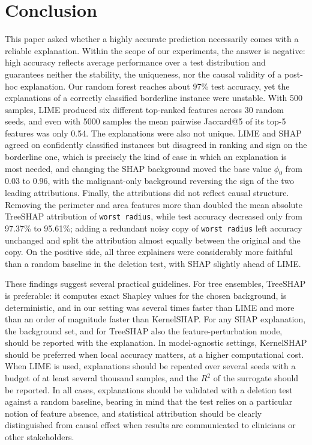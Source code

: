 \section{Conclusion}
\label{sec:conclusion}

This paper asked whether a highly accurate prediction necessarily comes with a reliable explanation. Within the scope of our experiments, the answer is negative: high accuracy reflects average performance over a test distribution and guarantees neither the stability, the uniqueness, nor the causal validity of a post-hoc explanation. Our random forest reaches about 97\% test accuracy, yet the explanations of a correctly classified borderline instance were unstable. With 500 samples, LIME produced six different top-ranked features across 30 random seeds, and even with 5000 samples the mean pairwise Jaccard@5 of its top-5 features was only 0.54. The explanations were also not unique. LIME and SHAP agreed on confidently classified instances but disagreed in ranking and sign on the borderline one, which is precisely the kind of case in which an explanation is most needed, and changing the SHAP background moved the base value $\phi_0$ from 0.03 to 0.96, with the malignant-only background reversing the sign of the two leading attributions. Finally, the attributions did not reflect causal structure. Removing the perimeter and area features more than doubled the mean absolute TreeSHAP attribution of \texttt{worst radius}, while test accuracy decreased only from 97.37\% to 95.61\%; adding a redundant noisy copy of \texttt{worst radius} left accuracy unchanged and split the attribution almost equally between the original and the copy. On the positive side, all three explainers were considerably more faithful than a random baseline in the deletion test, with SHAP slightly ahead of LIME.

These findings suggest several practical guidelines. For tree ensembles, TreeSHAP is preferable: it computes exact Shapley values for the chosen background, is deterministic, and in our setting was several times faster than LIME and more than an order of magnitude faster than KernelSHAP. For any SHAP explanation, the background set, and for TreeSHAP also the feature-perturbation mode, should be reported with the explanation. In model-agnostic settings, KernelSHAP should be preferred when local accuracy matters, at a higher computational cost. When LIME is used, explanations should be repeated over several seeds with a budget of at least several thousand samples, and the $R^2$ of the surrogate should be reported. In all cases, explanations should be validated with a deletion test against a random baseline, bearing in mind that the test relies on a particular notion of feature absence, and statistical attribution should be clearly distinguished from causal effect when results are communicated to clinicians or other stakeholders.

